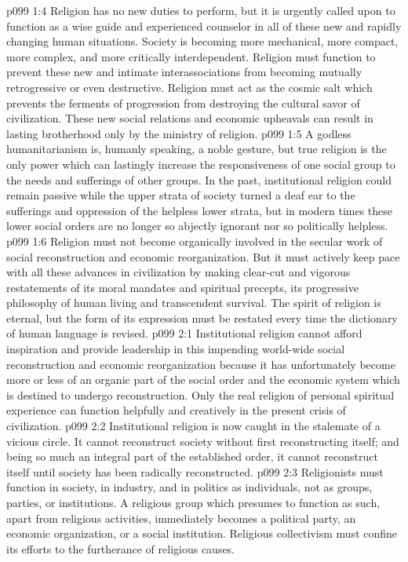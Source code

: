 \vs p099 1:4 Religion has no new duties to perform, but it is urgently called upon to function as a wise guide and experienced counselor in all of these new and rapidly changing human situations. Society is becoming more mechanical, more compact, more complex, and more critically interdependent. Religion must function to prevent these new and intimate interassociations from becoming mutually retrogressive or even destructive. Religion must act as the cosmic salt which prevents the ferments of progression from destroying the cultural savor of civilization. These new social relations and economic upheavals can result in lasting brotherhood only by the ministry of religion.
\vs p099 1:5 A godless humanitarianism is, humanly speaking, a noble gesture, but true religion is the only power which can lastingly increase the responsiveness of one social group to the needs and sufferings of other groups. In the past, institutional religion could remain passive while the upper strata of society turned a deaf ear to the sufferings and oppression of the helpless lower strata, but in modern times these lower social orders are no longer so abjectly ignorant nor so politically helpless.
\vs p099 1:6 Religion must not become organically involved in the secular work of social reconstruction and economic reorganization. But it must actively keep pace with all these advances in civilization by making clear\hyp{}cut and vigorous restatements of its moral mandates and spiritual precepts, its progressive philosophy of human living and transcendent survival. The spirit of religion is eternal, but the form of its expression must be restated every time the dictionary of human language is revised.
\vs p099 2:1 Institutional religion cannot afford inspiration and provide leadership in this impending world\hyp{}wide social reconstruction and economic reorganization because it has unfortunately become more or less of an organic part of the social order and the economic system which is destined to undergo reconstruction. Only the real religion of personal spiritual experience can function helpfully and creatively in the present crisis of civilization.
\vs p099 2:2 Institutional religion is now caught in the stalemate of a vicious circle. It cannot reconstruct society without first reconstructing itself; and being so much an integral part of the established order, it cannot reconstruct itself until society has been radically reconstructed.
\pc \vs p099 2:3 Religionists must function in society, in industry, and in politics as individuals, not as groups, parties, or institutions. A religious group which presumes to function as such, apart from religious activities, immediately becomes a political party, an economic organization, or a social institution. Religious collectivism must confine its efforts to the furtherance of religious causes.
